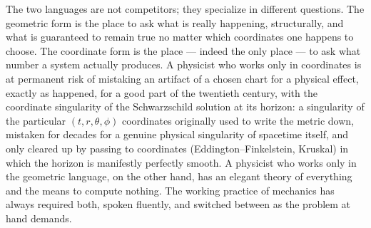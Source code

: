 The two languages are not competitors; they specialize in different
questions. The geometric form is the place to ask what is really
happening, structurally, and what is guaranteed to remain true no
matter which coordinates one happens to choose. The coordinate form
is the place --- indeed the only place --- to ask what number a
system actually produces. A physicist who works only in coordinates
is at permanent risk of mistaking an artifact of a chosen chart for a
physical effect, exactly as happened, for a good part of the
twentieth century, with the coordinate singularity of the
Schwarzschild solution at its horizon: a singularity of the
particular $(t,r,\theta,\phi)$ coordinates originally used to write
the metric down, mistaken for decades for a genuine physical
singularity of spacetime itself, and only cleared up by passing to
coordinates (Eddington--Finkelstein, Kruskal) in which the horizon is
manifestly perfectly smooth. A physicist who
works only in the geometric language, on the other hand, has an
elegant theory of everything and the means to compute nothing. The
working practice of mechanics has always required both, spoken
fluently, and switched between as the problem at hand demands.

